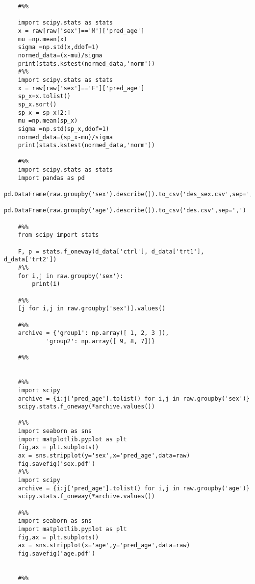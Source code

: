 \documentclass[fancy,11pt,twocol]{elegantbook}
\begin{document}
\begin{lstlisting}
	#%%
	
	import scipy.stats as stats
	x = raw[raw['sex']=='M']['pred_age']
	mu =np.mean(x)
	sigma =np.std(x,ddof=1)
	normed_data=(x-mu)/sigma
	print(stats.kstest(normed_data,'norm'))
	#%%
	import scipy.stats as stats
	x = raw[raw['sex']=='F']['pred_age']
	sp_x=x.tolist()
	sp_x.sort()
	sp_x = sp_x[2:]
	mu =np.mean(sp_x)
	sigma =np.std(sp_x,ddof=1)
	normed_data=(sp_x-mu)/sigma
	print(stats.kstest(normed_data,'norm'))
	
	#%%
	import scipy.stats as stats
	import pandas as pd
	pd.DataFrame(raw.groupby('sex').describe()).to_csv('des_sex.csv',sep=',')
	pd.DataFrame(raw.groupby('age').describe()).to_csv('des.csv',sep=',')
	
	#%%
	from scipy import stats
	
	F, p = stats.f_oneway(d_data['ctrl'], d_data['trt1'], d_data['trt2'])
	#%%
	for i,j in raw.groupby('sex'):
		print(i)
	
	#%%
	[j for i,j in raw.groupby('sex')].values()
	
	#%%
	archive = {'group1': np.array([ 1, 2, 3 ]),
			'group2': np.array([ 9, 8, 7])}
	
	#%%
	
	
	#%%
	import scipy
	archive = {i:j['pred_age'].tolist() for i,j in raw.groupby('sex')}
	scipy.stats.f_oneway(*archive.values())
	
	#%%
	import seaborn as sns
	import matplotlib.pyplot as plt
	fig,ax = plt.subplots()
	ax = sns.stripplot(y='sex',x='pred_age',data=raw)
	fig.savefig('sex.pdf')
	#%%
	import scipy
	archive = {i:j['pred_age'].tolist() for i,j in raw.groupby('age')}
	scipy.stats.f_oneway(*archive.values())
	
	#%%
	import seaborn as sns
	import matplotlib.pyplot as plt
	fig,ax = plt.subplots()
	ax = sns.stripplot(x='age',y='pred_age',data=raw)
	fig.savefig('age.pdf')
	
	
	#%%
	
\end{lstlisting}
\end{document}
